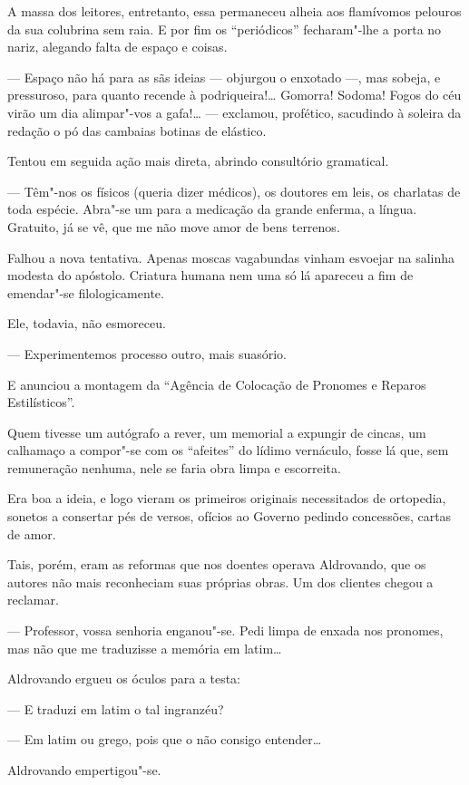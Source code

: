 A massa dos leitores, entretanto, essa permaneceu alheia aos flamívomos
pelouros da sua colubrina sem raia. E por fim os ``periódicos''
fecharam"-lhe a porta no nariz, alegando falta de espaço e coisas.

--- Espaço não há para as sãs ideias --- objurgou o enxotado ---, mas
sobeja, e pressuroso, para quanto recende à podriqueira!\ldots{} Gomorra!
Sodoma! Fogos do céu virão um dia alimpar"-vos a gafa!\ldots{} --- exclamou,
profético, sacudindo à soleira da redação o pó das cambaias botinas de
elástico.

Tentou em seguida ação mais direta, abrindo consultório gramatical.

--- Têm"-nos os físicos (queria dizer médicos), os doutores em leis, os
charlatas de toda espécie. Abra"-se um para a medicação da grande
enferma, a língua. Gratuito, já se vê, que me não move amor de bens
terrenos.

Falhou a nova tentativa. Apenas moscas vagabundas vinham esvoejar na
salinha modesta do apóstolo. Criatura humana nem uma só lá apareceu a
fim de emendar"-se filologicamente.

Ele, todavia, não esmoreceu.

--- Experimentemos processo outro, mais suasório.

E anunciou a montagem da ``Agência de Colocação de Pronomes e Reparos
Estilísticos''.

Quem tivesse um autógrafo a rever, um memorial a expungir de cincas, um
calhamaço a compor"-se com os ``afeites'' do lídimo vernáculo, fosse lá
que, sem remuneração nenhuma, nele se faria obra limpa e escorreita.

Era boa a ideia, e logo vieram os primeiros originais necessitados de
ortopedia, sonetos a consertar pés de versos, ofícios ao Governo pedindo
concessões, cartas de amor.

Tais, porém, eram as reformas que nos doentes operava Aldrovando, que os
autores não mais reconheciam suas próprias obras. Um dos clientes chegou
a reclamar.

--- Professor, vossa senhoria enganou"-se. Pedi limpa de enxada nos
pronomes, mas não que me traduzisse a memória em latim\ldots{}

Aldrovando ergueu os óculos para a testa:

--- E traduzi em latim o tal ingranzéu?

--- Em latim ou grego, pois que o não consigo entender\ldots{}

Aldrovando empertigou"-se.

